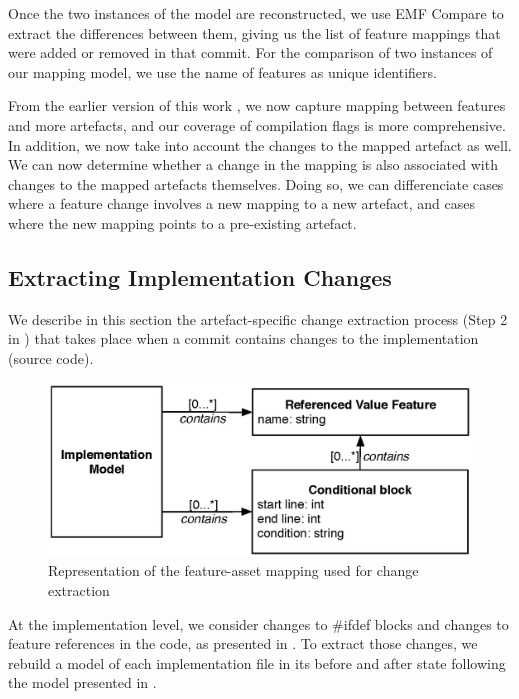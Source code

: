 Once the two instances of the model are reconstructed, we use EMF Compare to extract the differences between them,
giving us the list of feature mappings that were added or removed in that commit.
For the comparison of two instances of our mapping model, we use the name of features as unique identifiers.

From the earlier version of this work \citep{dintzner_fever:_2016}, we now capture mapping between features and more artefacts, and our coverage of compilation flags is more comprehensive.
In addition, we now take into account the changes to the mapped artefact as well. We can now determine whether a change in the mapping is also associated with changes to the mapped artefacts themselves. 
Doing so, we can differenciate cases where a feature change involves a new mapping to a new artefact, and cases where the new mapping points to a pre-existing artefact.


\subsection{Extracting Implementation Changes}
\label{sec_impl_model}

We describe in this section the artefact-specific change extraction process (Step 2 in )
that takes place when a commit contains changes to the implementation (source code).

\begin{figure}[h]
	\centering
	\includegraphics[scale=0.40]{EMF_Source_Model.eps}
	\caption{Representation of the feature-asset mapping used for change extraction}
	\label{fig:source_for_diff}
\end{figure}

At the implementation level, we consider changes to \#ifdef blocks and changes to feature references in the code, as presented in .
To extract those changes, we rebuild a model of each implementation file in its before 
and after state following the model presented in .

